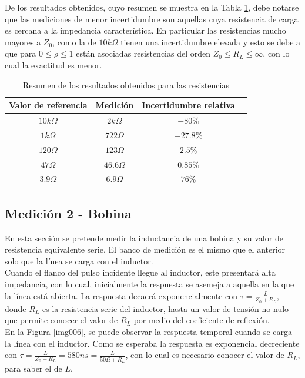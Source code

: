 \documentclass[a4paper,10pt]{article}
\begin{document}
	\indent De los resultados obtenidos, cuyo resumen se muestra en la Tabla 
	\ref{tab001}, debe notarse que las mediciones de menor incertidumbre son 
	aquellas cuya resistencia de carga es cercana a la impedancia 
	caracter\'istica. En particular las resistencias mucho mayores a $Z_0$, como
	la de $10k\Omega$ tienen una incertidumbre elevada y esto se debe a que para
	$0\leq \rho \leq 1$ est\'an asociadas resistencias del orden 
	$Z_0 \leq R_L \leq \infty$, con lo cual la exactitud es menor.
	
		\begin{table}[!htp]
			\centering
			\begin{tabular}{|c|c|c|c|}
				\hline
    			Valor de referencia & Medici\'on & Incertidumbre relativa \\
				\hline
				$10k\Omega$ & $2k\Omega$ &$-80 \% $ \\
				\hline 
				$1k\Omega$ & $722\Omega$ &$-27.8\%$\\
				\hline
				$120\Omega$ & $123\Omega$ &$2.5\% $ \\
				\hline
				$47\Omega$ & $46.6\Omega$ &$0.85\% $ \\
				\hline
				$3.9\Omega$ & $6.9\Omega$ &$76\% $  \\
				\hline								
			\end{tabular}
			\caption{Resumen de los resultados obtenidos para las resistencias
			} 
			\label{tab001}
		\end{table}
		
						
	\subsection{Medición 2 - Bobina}
	\indent En esta secci\'on se pretende medir la inductancia de una bobina y
	su valor de resistencia equivalente serie. El banco de medici\'on es el 
	mismo que el anterior solo que la l\'inea se carga con el inductor. \\
	\indent Cuando el flanco del pulso incidente llegue al inductor, este 
	presentar\'a alta impedancia, con lo cual, inicialmente la respuesta se 
	asemeja a aquella en la que la l\'inea est\'a abierta. La respuesta 
	decaer\'a exponencialmente con $\tau=\frac{L}{Z_0+R_L}$, donde $R_L$ es la
	resistencia serie del inductor, hasta un valor de tensi\'on no nulo que 
	permite conocer el valor de $R_L$ por medio del coeficiente de 
	reflexi\'on. \\
	\indent En la Figura \ref{img006}, se puede observar la respuesta temporal
	cuando se carga la l\'inea con el inductor. Como se esperaba la respuesta
	es exponencial decreciente con 
	$\tau=\frac{L}{Z_0+R_L}=580ns=\frac{L}{50\Omega+R_L}$, con lo cual es 
	necesario conocer el valor de $R_L$, para saber el de $L$.
		
\end{document}
